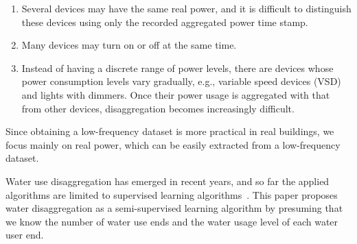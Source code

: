 \begin{enumerate}
\item Several devices may have the same real power, and
it is difficult to distinguish these devices using only the recorded aggregated
power time stamp.
\item Many devices may turn on or off at the same time.
\item Instead of having a discrete range of power
levels, there are devices whose power consumption levels
   vary gradually, e.g.,
  variable speed devices (VSD) and lights with dimmers.
Once their power usage is aggregated with that from other devices,
disaggregation becomes increasingly difficult.
\end{enumerate}
Since obtaining a low-frequency dataset is more practical in real buildings, 
we focus mainly on real power, which can be easily extracted 
from a low-frequency dataset.  

Water use disaggregation has emerged in recent years, and so far 
the applied algorithms are 
limited to supervised learning algorithms~\cite{carboni2016contextualising}. 
This paper proposes water disaggregation as a semi-supervised learning algorithm 
by presuming that we know the number of water use ends and the water usage level of each 
water user end.  

